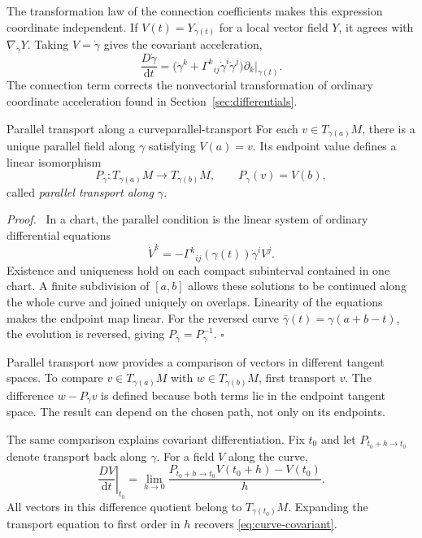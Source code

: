 \documentclass[11pt,a4paper]{article}
\numberwithin{equation}{section}
\newcommand{\dd}{\mathrm d}
\newcommand{\proofend}{\unskip\nobreak\hfill\(\square\)\par}
\newenvironment{proof}{\par\noindent\textit{Proof.}\ }{\proofend}
\begin{document}
The transformation law of the connection coefficients makes this
expression coordinate independent. If \(V(t)=Y_{\gamma(t)}\) for a
local vector field \(Y\), it agrees with \(\nabla_{\dot\gamma}Y\).
Taking \(V=\dot\gamma\) gives the covariant acceleration,
\[
 \frac{D\dot\gamma}{\dd t}
 =\bigl(\ddot\gamma^k+
        \Gamma^k{}_{ij}\dot\gamma^i\dot\gamma^j\bigr)
      \partial_k|_{\gamma(t)}.
\]
The connection term corrects the nonvectorial transformation of ordinary
coordinate acceleration found in Section~\ref{sec:differentials}.

\begin{theorem}{Parallel transport along a curve}{parallel-transport}
For each \(v\in T_{\gamma(a)}M\), there is a unique parallel field
along \(\gamma\) satisfying \(V(a)=v\). Its endpoint value defines a
linear isomorphism
\[
 P_\gamma:T_{\gamma(a)}M\longrightarrow T_{\gamma(b)}M,
 \qquad P_\gamma(v)=V(b),
\]
called \emph{parallel transport along \(\gamma\)}.
\end{theorem}

\begin{proof}
In a chart, the parallel condition is the linear system of ordinary
differential equations
\[
 \dot V^k=-\Gamma^k{}_{ij}(\gamma(t))\dot\gamma^iV^j.
\]
Existence and uniqueness hold on each compact subinterval contained in
one chart. A finite subdivision of \([a,b]\) allows these solutions
to be continued along the whole curve and joined uniquely on overlaps.
Linearity of the equations makes the endpoint map linear. For the
reversed curve \(\bar\gamma(t)=\gamma(a+b-t)\), the evolution is
reversed, giving \(P_{\bar\gamma}=P_\gamma^{-1}\).
\end{proof}

Parallel transport now provides a comparison of vectors in different
tangent spaces. To compare \(v\in T_{\gamma(a)}M\) with
\(w\in T_{\gamma(b)}M\), first transport \(v\). The difference
\(w-P_\gamma v\) is defined because both terms lie in the endpoint
tangent space. The result can depend on the chosen path, not only on
its endpoints.

The same comparison explains covariant differentiation. Fix \(t_0\)
and let \(P_{t_0+h\to t_0}\) denote transport back along \(\gamma\).
For a field \(V\) along the curve,
\[
 \left.\frac{DV}{\dd t}\right|_{t_0}
 =\lim_{h\to0}
 \frac{P_{t_0+h\to t_0}V(t_0+h)-V(t_0)}{h}.
\]
All vectors in this difference quotient belong to \(T_{\gamma(t_0)}M\).
Expanding the transport equation to first order in \(h\) recovers
\eqref{eq:curve-covariant}.
\end{document}
